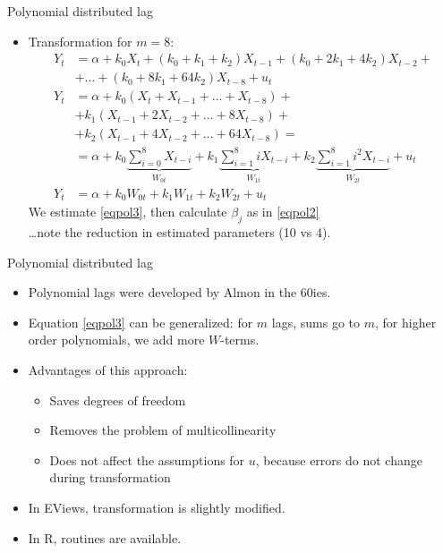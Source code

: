 \documentclass{beamer}
\begin{document}

\begin{frame}{Polynomial distributed lag}
\begin{itemize}
\item Transformation for $m=8$:
\begin{align} \nonumber
Y_t & =  \alpha + k_0 X_t + (k_0 + k_1 + k_2)X_{t-1} + (k_0 + 2k_1 + 4k_2)X_{t-2} + \\ & + \dots + (k_0 + 8k_1 + 64k_2)X_{t-8}+u_t 
\\ \nonumber
Y_t & = \alpha + k_0 (X_t + X_{t-1} + \dots + X_{t-8}) + \\ \nonumber & +  k_1(X_{t-1} + 2 X_{t-2} + \dots + 8 X_{t-8}) + \\ \nonumber & + k_2(X_{t-1} + 4X_{t-2} + \dots + 64X_{t-8}) = \\ & = 
\alpha + k_0 \underbrace{\sum_{i=0}^8 X_{t-i}}_{W_{0t}} + k_1 \underbrace{\sum_{i=1}^8 i X_{t-i}}_{W_{1t}}  + k_2 \underbrace{\sum_{i=1}^8 i^2 X_{t-i}}_{W_{2t}}  + u_t\\
Y_t & = \alpha + k_0 W_{0t} + k_1 W_{1t} + k_2 W_{2t} + u_t \label{eqpol3}
\end{align}
We estimate \eqref{eqpol3}, then calculate $\beta_j$ as in \eqref{eqpol2}\\
\dots note the reduction in estimated parameters (10 vs 4).
\end{itemize}
\end{frame}


\begin{frame}{Polynomial distributed lag}

\begin{itemize}
\item Polynomial lags were developed by Almon in the 60ies.
\item Equation \eqref{eqpol3} can be generalized: for $m$ lags, sums go to $m$, for higher order polynomials, we add more $W$-terms.
\vspace{0.3cm}
\item Advantages of this approach:
\begin{itemize}
\item Saves degrees of freedom
 \item Removes the problem of multicollinearity
 \item Does not affect the assumptions for $u$, because errors do not change during transformation
\end{itemize}
\vspace{0.3cm}
\item In EViews, transformation is slightly modified.
\item In R, routines are available.

\end{itemize}
\end{frame}
\end{document}
